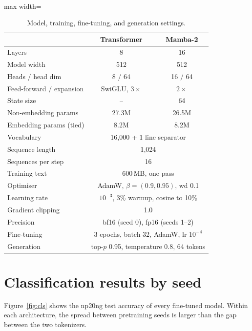 \documentclass[11pt]{article}
\begin{document}
\begin{table}[H]
  \centering
  \small
  \begin{adjustbox}{max width=\columnwidth}
  \begin{tabular}{lcc}
    \toprule
    & Transformer & Mamba-2 \\
    \midrule
    Layers & 8 & 16 \\
    Model width & 512 & 512 \\
    Heads / head dim & 8 / 64 & 16 / 64 \\
    Feed-forward / expansion & SwiGLU, $3\times$ & $2\times$ \\
    State size & -- & 64 \\
    Non-embedding params & 27.3M & 26.5M \\
    Embedding params (tied) & 8.2M & 8.2M \\
    \midrule
    Vocabulary & \multicolumn{2}{c}{16,000 + 1 line separator} \\
    Sequence length & \multicolumn{2}{c}{1,024} \\
    Sequences per step & \multicolumn{2}{c}{16} \\
    Training text & \multicolumn{2}{c}{600\,MB, one pass} \\
    Optimiser & \multicolumn{2}{c}{AdamW, $\beta=(0.9, 0.95)$, wd 0.1} \\
    Learning rate & \multicolumn{2}{c}{$10^{-3}$, 3\% warmup, cosine to 10\%} \\
    Gradient clipping & \multicolumn{2}{c}{1.0} \\
    Precision & \multicolumn{2}{c}{bf16 (seed 0), fp16 (seeds 1--2)} \\
    \midrule
    Fine-tuning & \multicolumn{2}{c}{3 epochs, batch 32, AdamW, lr $10^{-4}$} \\
    Generation & \multicolumn{2}{c}{top-$p$ 0.95, temperature 0.8, 64 tokens} \\
    \bottomrule
  \end{tabular}
  \end{adjustbox}
  \caption{Model, training, fine-tuning, and generation settings.}
  \label{tab:hparams}
\end{table}

\section{Classification results by seed}\label{app:cls}

Figure~\ref{fig:cls} shows the np20ng test accuracy of every fine-tuned model. Within each architecture, the spread between pretraining seeds is larger than the gap between the two tokenizers.
\end{document}
